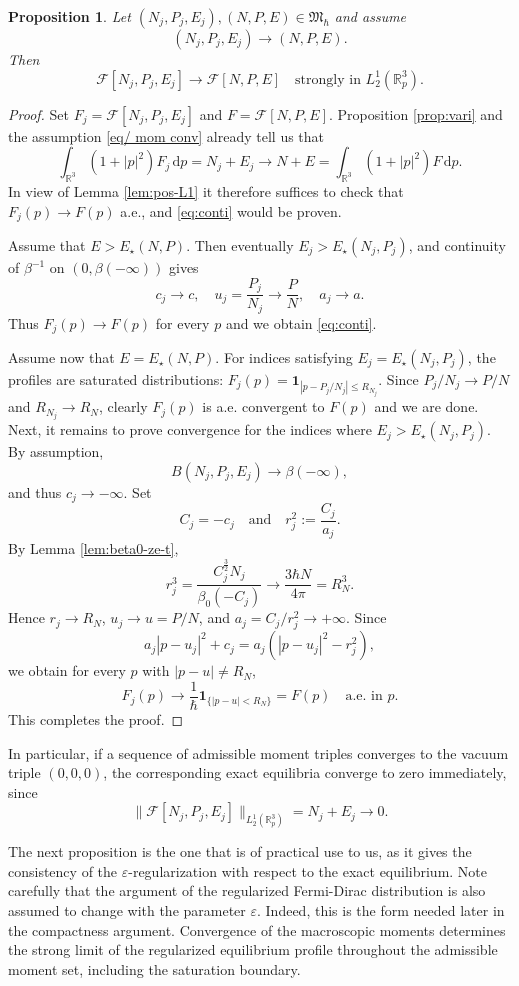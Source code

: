 \documentclass[10pt,reqno]{amsart}
\numberwithin{equation}{section}
\newtheorem{proposition}{Proposition}[section]
\theoremstyle{definition}
\newcommand{\R}{\mathbb R}
\newcommand{\dpp}{\mathrm{d}p}
\newcommand{\e}{\varepsilon}
\newcommand{\one}{\mathbf 1}
\newcommand{\calF}{\mathcal F}
\newcommand{\bq}{\begin{equation}}
\newcommand{\eq}{\end{equation}}
\newcommand{\lt}{\left}
\newcommand{\rt}{\right}
\begin{document}
\begin{proposition}%
Let $(N_j,P_j,E_j),(N,P,E)\in\mathfrak M_\hbar$ and assume
\begin{equation}\label{eq/ mom conv}
 (N_j,P_j,E_j)\to(N,P,E).
\end{equation}
Then
\bq \label{eq:conti}
 \calF[N_j,P_j,E_j]  \to \calF[N,P,E]  \quad\text{strongly in }L^1_2(\R^3_p).
\eq
\end{proposition}

\begin{proof}
Set $F_j=\calF[N_j,P_j,E_j]$ and $F=\calF[N,P,E]$. Proposition \ref{prop:vari} and the assumption \eqref{eq/ mom conv} already tell us that
\[
 \int_{\R^3}(1+|p|^2)F_j\,\dpp=N_j+E_j  \to N+E  =\int_{\R^3}(1+|p|^2)F\,\dpp.
\]
In view of Lemma \ref{lem:pos-L1} it therefore suffices to check that $F_j(p)\to F(p)$ a.e., and \eqref{eq:conti} would be proven.
 

Assume that $E>E_\star(N,P)$. Then eventually $E_j>E_\star(N_j,P_j)$, and continuity of $\beta^{-1}$ on $(0,\beta(-\infty))$ gives
\[
 c_j\to c,  \quad  u_j=\frac{P_j}{N_j}\to\frac PN,  \quad  a_j\to a.
\]
Thus $F_j(p)\to F(p)$ for every $p$ and we obtain \eqref{eq:conti}.

Assume now that $E=E_\star(N,P)$.  For indices satisfying $E_j=E_\star(N_j,P_j)$, the profiles are saturated distributions: $F_j(p) = \mathbf{1}_{|p-P_j/N_j|\le R_{N_j}}$. Since $P_j/N_j\to P/N$ and $R_{N_j}\to R_N$, clearly $F_j(p)$ is a.e. convergent to $F(p)$ and we are done. Next, it remains to prove convergence for the indices where $E_j > E_\star(N_j,P_j)$. By assumption,
\[
 B(N_j,P_j,E_j)\to\beta(-\infty),
\]
and thus $c_j\to-\infty$.  Set  
\[
C_j=-c_j \quad \text{and} \quad r_j^2:=\frac{C_j}{a_j}.
\]
By Lemma \ref{lem:beta0-ze-t},
\[
 r_j^3  =\frac{C_j^{\frac32}N_j}{\beta_0(-C_j)}  \to\frac{3\hbar N}{4\pi}=R_N^3.
\]
Hence $r_j\to R_N$, $u_j\to u=P/N$, and $a_j=C_j/r_j^2\to+\infty$.  Since
\[
 a_j|p-u_j|^2+c_j  =a_j\lt(|p-u_j|^2-r_j^2\rt),
\]
we obtain for every $p$ with $|p-u|\neq R_N$,
\[
 F_j(p)\to\frac1\hbar\one_{\{|p-u|<R_N\}}=F(p)  \quad\text{a.e. in }p.
\]
This completes the proof.
\end{proof}

In particular, if a sequence of admissible moment triples converges to the vacuum triple $(0,0,0)$, the corresponding exact equilibria converge to zero immediately, since
\[
 \|\calF[N_j,P_j,E_j]\|_{L^1_2(\R^3_p)}=N_j+E_j\to0.
\]

The next proposition is the one that is of practical use to us, as it gives the consistency of the $\e$-regularization with respect to the exact equilibrium. Note carefully that the argument of the regularized Fermi-Dirac distribution is also assumed to change with the parameter $\e$. Indeed, this is the form needed later in the compactness argument. Convergence of the macroscopic moments determines the strong limit of the regularized equilibrium profile throughout the admissible moment set, including the saturation boundary.
\end{document}
